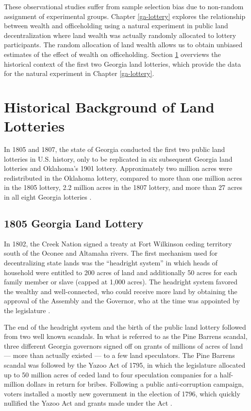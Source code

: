 These observational studies suffer from sample selection bias due to non-random assignment of experimental groups. Chapter \ref{ga-lottery} explores the relationship between wealth and officeholding using a natural experiment in public land decentralization where land wealth was actually randomly allocated to lottery participants. The random allocation of land wealth allows us to obtain unbiased estimates of the effect of wealth on officeholding. Section \ref{land-lotteries-background} overviews the historical context of the first two Georgia land lotteries, which provide the data for the natural experiment in Chapter \ref{ga-lottery}.%

\section{Historical Background of Land Lotteries} \label{land-lotteries-background}

In 1805 and 1807, the state of Georgia conducted the first two public land lotteries in U.S. history, only to be replicated in six subsequent Georgia land lotteries and Oklahoma's 1901 lottery. Approximately two million acres were redistributed in the Oklahoma lottery, compared to more than one million acres in the 1805 lottery, 2.2 million acres in the 1807 lottery, and more than 27 acres in all eight Georgia lotteries \citep{graham2004}. 

\subsection{1805 Georgia Land Lottery}

In 1802, the Creek Nation signed a treaty at Fort Wilkinson ceding territory south of the Oconee and Altamaha rivers. The first mechanism used for decentralizing state lands was the ``headright system'' in which heads of household were entitled to 200 acres of land and additionally 50 acres for each family member or slave (capped at 1,000 acres). The headright system favored the wealthy and well-connected, who could receive more land by obtaining the approval of the Assembly and the Governor, who at the time was appointed by the legislature \citep{meyers2012}. 

The end of the headright system and the birth of the public land lottery followed from two well known scandals. In what is referred to as the Pine Barrens scandal, three different Georgia governors signed off on grants of millions of acres of land --- more than actually existed --- to a few land speculators. The Pine Barrens scandal was followed by the Yazoo Act of 1795, in which the legislature allocated up to 50 million acres of ceded land to four speculation companies for a half-million dollars in return for bribes. Following a public anti-corruption campaign, voters installed a mostly new government in the election of 1796, which quickly nullified the Yazoo Act and grants made under the Act \citep{meyers2012}. 

